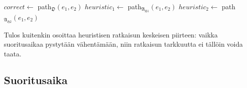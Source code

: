 \documentclass[10pt,a4paper]{article}
\begin{document}
\begin{algorithmic}
\State $correct \gets $ path$_\mathfrak{D}( e_1 , e_2 )$
\State $heuristic_1 \gets $ path$_\mathfrak{A_{H1}}( e_1 , e_2 )$
\State $heuristic_2 \gets $ path$_\mathfrak{A_{H2}}( e_1 , e_2 )$
\EndFor
\EndFor
\end{algorithmic}

Tulos kuitenkin osoittaa heuristisen ratkaisun keskeisen piirteen: vaikka suoritusaikaa pystytään vähentämään, niin ratkaisun tarkkuutta ei tällöin voida taata.

\subsection{Suoritusaika}
\label{suoritusaika}

 

\end{document}
